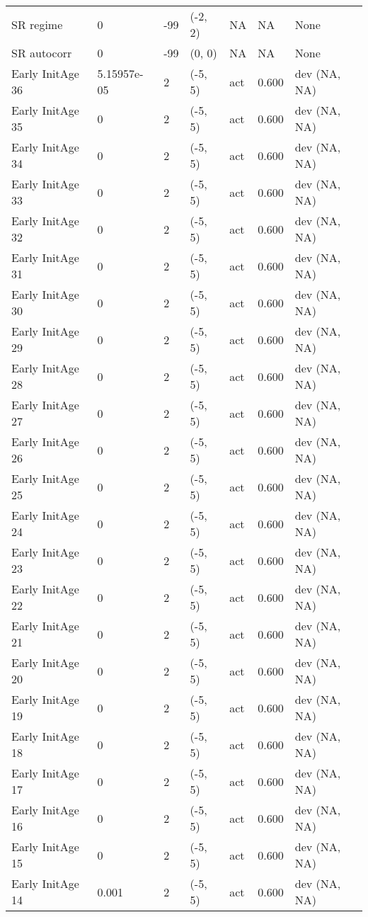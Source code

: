 \documentclass[11pt,
  english,
  letterpaper,
]{article}
\begin{document}
\begin{landscape}
\begin{longtable}[t]{>{\raggedright\arraybackslash}p{7.5cm}lllll>{\raggedright\arraybackslash}p{3.5cm}}
SR regime & 0 & -99 & (-2, 2) & NA & NA & None\\
SR autocorr & 0 & -99 & (0, 0) & NA & NA & None\\
Early InitAge 36 & 5.15957e-05 & 2 & (-5, 5) & act & 0.600 & dev (NA, NA)\\
Early InitAge 35 & 0 & 2 & (-5, 5) & act & 0.600 & dev (NA, NA)\\
Early InitAge 34 & 0 & 2 & (-5, 5) & act & 0.600 & dev (NA, NA)\\
Early InitAge 33 & 0 & 2 & (-5, 5) & act & 0.600 & dev (NA, NA)\\
Early InitAge 32 & 0 & 2 & (-5, 5) & act & 0.600 & dev (NA, NA)\\
Early InitAge 31 & 0 & 2 & (-5, 5) & act & 0.600 & dev (NA, NA)\\
Early InitAge 30 & 0 & 2 & (-5, 5) & act & 0.600 & dev (NA, NA)\\
Early InitAge 29 & 0 & 2 & (-5, 5) & act & 0.600 & dev (NA, NA)\\
Early InitAge 28 & 0 & 2 & (-5, 5) & act & 0.600 & dev (NA, NA)\\
Early InitAge 27 & 0 & 2 & (-5, 5) & act & 0.600 & dev (NA, NA)\\
Early InitAge 26 & 0 & 2 & (-5, 5) & act & 0.600 & dev (NA, NA)\\
Early InitAge 25 & 0 & 2 & (-5, 5) & act & 0.600 & dev (NA, NA)\\
Early InitAge 24 & 0 & 2 & (-5, 5) & act & 0.600 & dev (NA, NA)\\
Early InitAge 23 & 0 & 2 & (-5, 5) & act & 0.600 & dev (NA, NA)\\
Early InitAge 22 & 0 & 2 & (-5, 5) & act & 0.600 & dev (NA, NA)\\
Early InitAge 21 & 0 & 2 & (-5, 5) & act & 0.600 & dev (NA, NA)\\
Early InitAge 20 & 0 & 2 & (-5, 5) & act & 0.600 & dev (NA, NA)\\
Early InitAge 19 & 0 & 2 & (-5, 5) & act & 0.600 & dev (NA, NA)\\
Early InitAge 18 & 0 & 2 & (-5, 5) & act & 0.600 & dev (NA, NA)\\
Early InitAge 17 & 0 & 2 & (-5, 5) & act & 0.600 & dev (NA, NA)\\
Early InitAge 16 & 0 & 2 & (-5, 5) & act & 0.600 & dev (NA, NA)\\
Early InitAge 15 & 0 & 2 & (-5, 5) & act & 0.600 & dev (NA, NA)\\
Early InitAge 14 & 0.001 & 2 & (-5, 5) & act & 0.600 & dev (NA, NA)\\

\end{longtable}
\end{landscape}
\end{document}
